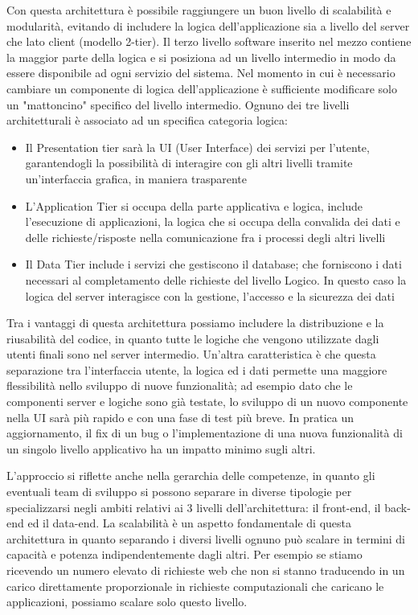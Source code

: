 Con questa architettura è possibile raggiungere un buon livello di scalabilità
e modularità, evitando di includere la logica dell’applicazione sia a livello del
server che lato client (modello 2-tier).
Il terzo livello software inserito nel mezzo contiene la maggior parte della logica
e si posiziona ad un livello intermedio in modo da essere disponibile ad ogni
servizio del sistema. Nel momento in cui è necessario cambiare un componente di
logica dell’applicazione è sufficiente modificare solo un "mattoncino" specifico del
livello intermedio.
Ognuno dei tre livelli architetturali è associato ad un specifica categoria logica:
\begin{itemize}
	\item Il Presentation tier sarà la UI (User Interface) dei servizi per l’utente,
	garantendogli la possibilità di interagire con gli altri livelli tramite
	un'interfaccia grafica, in maniera trasparente
	\item L'Application Tier si occupa della parte applicativa e logica,
	include l’esecuzione di applicazioni, la logica che si occupa della convalida
	dei dati e delle richieste/risposte nella comunicazione fra i processi degli
	altri livelli
	\item Il Data Tier include i servizi che gestiscono il database; che forniscono
	i dati necessari al completamento delle richieste del livello Logico. In questo
	caso la logica del server interagisce con la gestione, l’accesso e la sicurezza
	dei dati
\end{itemize}
Tra i vantaggi di questa architettura possiamo includere la distribuzione e la
riusabilità del codice, in quanto tutte le logiche che vengono utilizzate dagli
utenti finali sono nel server intermedio. Un'altra caratteristica è che questa
separazione tra l'interfaccia utente, la logica ed i dati permette una maggiore
flessibilità nello sviluppo di nuove funzionalità; ad esempio dato che le
componenti server e logiche sono già testate, lo sviluppo di un nuovo componente
nella UI sarà più rapido e con una fase di test più breve. In pratica un
aggiornamento, il fix di un bug o l'implementazione di una nuova funzionalità di
un singolo livello applicativo ha un impatto minimo sugli altri.

L'approccio si riflette anche nella gerarchia delle competenze, in quanto gli
eventuali team di sviluppo si possono separare in diverse tipologie per
specializzarsi negli ambiti relativi ai 3 livelli dell'architettura: il front-end,
il back-end ed il data-end. La scalabilità è un aspetto fondamentale di questa
architettura in quanto separando i diversi livelli ognuno può scalare in termini
di capacità e potenza indipendentemente dagli altri. Per esempio se stiamo ricevendo
un numero elevato di richieste web che non si stanno traducendo in un carico
direttamente proporzionale in richieste computazionali che caricano le applicazioni,
possiamo scalare solo questo livello.

